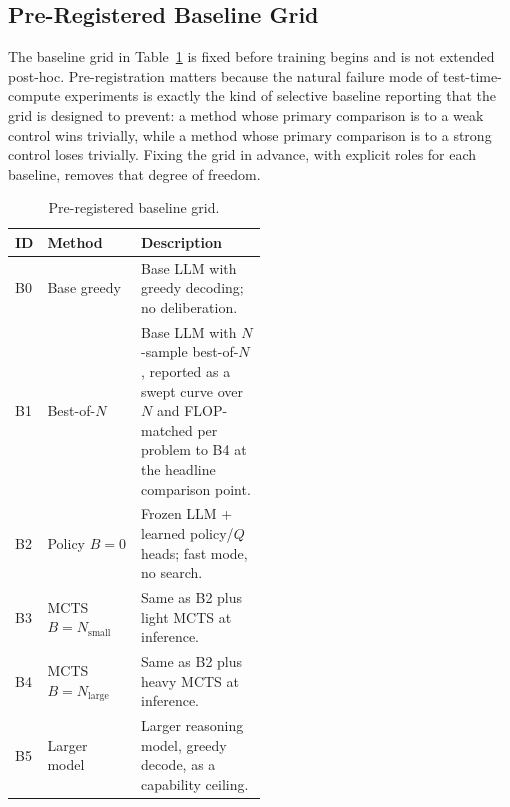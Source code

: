 \subsection{Pre-Registered Baseline Grid}
\label{sec:exp-baselines}

The baseline grid in Table~\ref{tab:baselines} is fixed before training
begins and is not extended post-hoc. Pre-registration matters because
the natural failure mode of test-time-compute experiments is exactly
the kind of selective baseline reporting that the grid is designed to
prevent: a method whose primary comparison is to a weak control wins
trivially, while a method whose primary comparison is to a strong
control loses trivially. Fixing the grid in advance, with explicit
roles for each baseline, removes that degree of freedom.

\begin{table}[t]
\centering
\caption{Pre-registered baseline grid.}
\label{tab:baselines}
\small
\begin{tabular}{@{}llp{0.5\linewidth}@{}}
\toprule
ID & Method & Description \\
\midrule
B0 & Base greedy        & Base LLM with greedy decoding; no deliberation. \\
B1 & Best-of-$N$        & Base LLM with $N$-sample best-of-$N$, reported as a
                          swept curve over $N$ and FLOP-matched per problem to
                          B4 at the headline comparison point. \\
B2 & Policy $B{=}0$     & Frozen LLM + learned policy/$Q$ heads; fast mode,
                          no search. \\
B3 & MCTS $B{=}N_{\mathrm{small}}$ & Same as B2 plus light MCTS at
                          inference. \\
B4 & MCTS $B{=}N_{\mathrm{large}}$ & Same as B2 plus heavy MCTS at
                          inference. \\
B5 & Larger model       & Larger reasoning model, greedy decode, as a
                          capability ceiling. \\
\bottomrule
\end{tabular}
\end{table}

